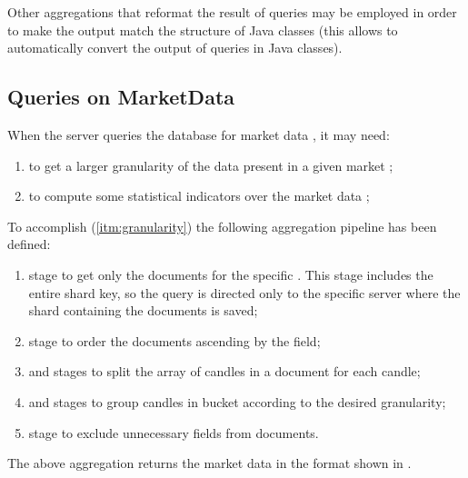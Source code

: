 Other aggregations that reformat the result of queries may be employed in order
to make the output match the structure of Java classes (this allows \mongodb{}
to automatically convert the output of queries in Java classes).

\subsection{Queries on MarketData}\label{subsec:marketdata-aggregations}

When the server queries the database for market data , it may need:
\begin{enumerate}
	\item\label{itm:granularity} to get a larger granularity of the data
		present in a given market ;
	\item\label{itm:indicators} to compute some statistical indicators over
		the market data ;
\end{enumerate}

To accomplish (\ref{itm:granularity}) the following aggregation pipeline has
been defined:
\begin{enumerate}
	\item {} stage to get only the documents for the specific
		. This stage includes the entire shard key, so the
		query is directed only to the specific server where the shard
		containing the documents is saved;
	\item {} stage to order the documents ascending by the
		 field;
	\item {} and  stages to split the array
		of candles in a document for each candle;
	\item {} and  stages to group candles in
		bucket according to the desired granularity;
	\item {} stage to exclude unnecessary fields from
		documents.
\end{enumerate}

The above aggregation returns the market data in the format shown in
.



